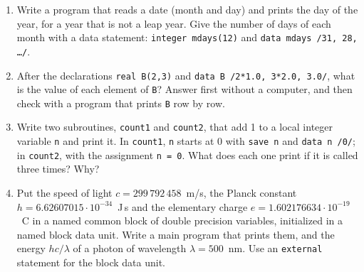 \begin{enumerate}
    \item Write a program that reads a date (month and day) and prints the day of the year, for a year that is not a leap year. Give the number of days of each month with a data statement: \texttt{integer mdays(12)} and \texttt{data mdays /31, 28, \ldots/}.
    \item After the declarations \texttt{real B(2,3)} and \texttt{data B /2*1.0, 3*2.0, 3.0/}, what is the value of each element of \texttt{B}? Answer first without a computer, and then check with a program that prints \texttt{B} row by row.
    \item Write two subroutines, \texttt{count1} and \texttt{count2}, that add 1 to a local integer variable \texttt{n} and print it. In \texttt{count1}, \texttt{n} starts at 0 with \texttt{save n} and \texttt{data n /0/}; in \texttt{count2}, with the assignment \texttt{n = 0}. What does each one print if it is called three times? Why?
    \item Put the speed of light $c = 299\,792\,458$~m/s, the Planck constant $h = 6.62607015 \cdot 10^{-34}$~J\,s and the elementary charge $e = 1.602176634 \cdot 10^{-19}$~C in a named common block of double precision variables, initialized in a named block data unit. Write a main program that prints them, and the energy $hc/\lambda$ of a photon of wavelength $\lambda = 500$~nm. Use an \texttt{external} statement for the block data unit.
\end{enumerate}
